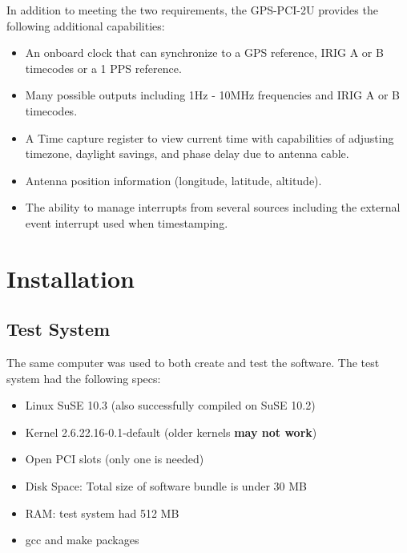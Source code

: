 \documentclass[11pt]{article}
\begin{document}
    In addition to meeting the two requirements, the GPS-PCI-2U provides the following additional capabilities:
    \begin{itemize}
        \item An onboard clock that can synchronize to a GPS reference, IRIG A or B timecodes or a 1 PPS reference.
        \item Many possible outputs including 1Hz - 10MHz frequencies and IRIG A or B timecodes.
        \item A Time capture register to view current time with capabilities of adjusting timezone, daylight savings, and phase delay due to antenna cable.
        \item Antenna position information (longitude, latitude, altitude).
        \item The ability to manage interrupts from several sources including the external event interrupt used when timestamping.
    \end{itemize}





    \section{Installation} \label{sec:install}

    \subsection{Test System} \label{subsec:requirements}
    The same computer was used to both create and test the software.
    The test system had the following specs:
    \begin{itemize}
        \item Linux SuSE 10.3 (also successfully compiled on SuSE 10.2)
        \item Kernel 2.6.22.16-0.1-default (older kernels \textbf{may not work})
        \item Open PCI slots (only one is needed)
        \item Disk Space: Total size of software bundle is under 30 MB
        \item RAM: test system had 512 MB
        \item gcc and make packages
    \end{itemize}
\end{document}
